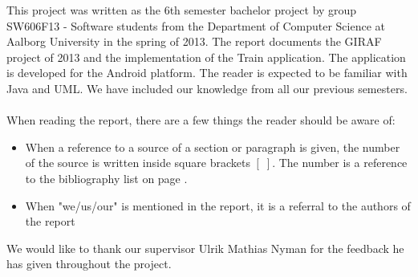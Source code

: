 This project was written as the 6th semester bachelor project by group SW606F13 - Software students from the Department of Computer Science at Aalborg University in the spring of 2013. The report documents the GIRAF project of 2013 and the implementation of the Train application. The application is developed for the Android platform. The reader is expected to be familiar with Java and UML. We have included our knowledge from all our previous semesters.
\\\\
When reading the report, there are a few things the reader should be aware of:
\begin{itemize}
\item When a reference to a source of a section or paragraph is given, the number of the source is written inside square brackets $[\;]$. The number is a reference to the bibliography list on page \pageref{chap:bib}.
\item When "we/us/our" is mentioned in the report, it is a referral to the authors of the report
\end{itemize}
We would like to thank our supervisor Ulrik Mathias Nyman for the feedback he has given throughout the project.
